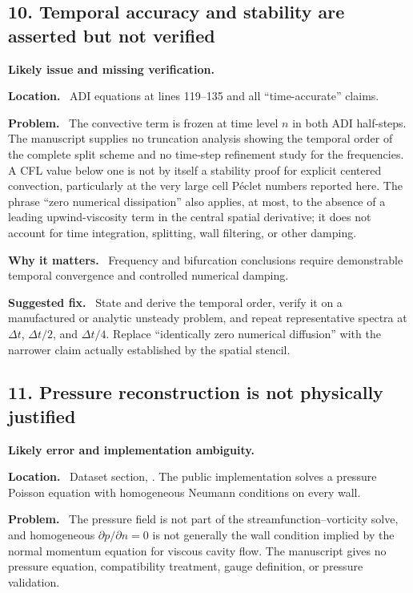 \documentclass[11pt,a4paper]{article}
\newcommand{\classify}[1]{\textcolor{blue!65!black}{\textbf{#1}}}
\newcommand{\field}[1]{\par\noindent\textbf{#1}\ }
\begin{document}
\subsection*{10. Temporal accuracy and stability are asserted but not verified}

\classify{Likely issue and missing verification.}

\field{Location.} ADI equations at lines 119--135 and all ``time-accurate'' claims.

\field{Problem.} The convective term is frozen at time level $n$ in both ADI half-steps. The manuscript supplies no truncation analysis showing the temporal order of the complete split scheme and no time-step refinement study for the frequencies. A CFL value below one is not by itself a stability proof for explicit centered convection, particularly at the very large cell P\'eclet numbers reported here. The phrase ``zero numerical dissipation'' also applies, at most, to the absence of a leading upwind-viscosity term in the central spatial derivative; it does not account for time integration, splitting, wall filtering, or other damping.

\field{Why it matters.} Frequency and bifurcation conclusions require demonstrable temporal convergence and controlled numerical damping.

\field{Suggested fix.} State and derive the temporal order, verify it on a manufactured or analytic unsteady problem, and repeat representative spectra at $\Delta t$, $\Delta t/2$, and $\Delta t/4$. Replace ``identically zero numerical diffusion'' with the narrower claim actually established by the spatial stencil.

\subsection*{11. Pressure reconstruction is not physically justified}

\classify{Likely error and implementation ambiguity.}

\field{Location.} Dataset section, . The public implementation solves a pressure Poisson equation with homogeneous Neumann conditions on every wall.

\field{Problem.} The pressure field is not part of the streamfunction--vorticity solve, and homogeneous $\partial p/\partial n=0$ is not generally the wall condition implied by the normal momentum equation for viscous cavity flow. The manuscript gives no pressure equation, compatibility treatment, gauge definition, or pressure validation.
\end{document}
